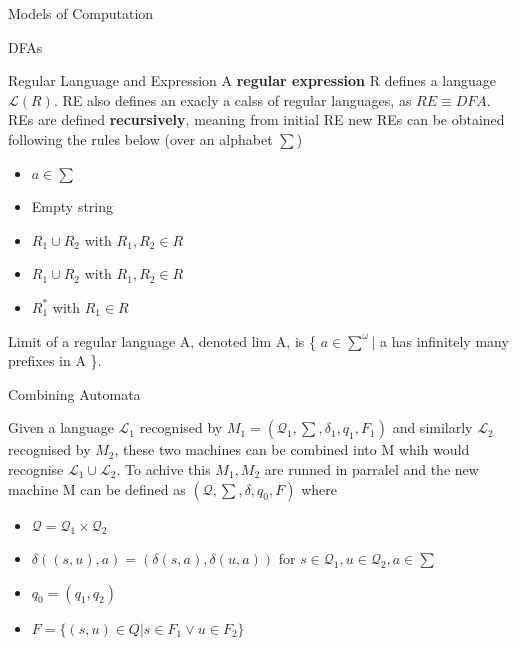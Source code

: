 \documentclass[12pt, letterpaper]{article}
\begin{document}
\begin{section}{Models of Computation}
\begin{subsection}{DFAs}
\begin{subsubsection}{Regular Language and Expression}
      A \textbf{regular expression} R defines a language \(\mathscr{L}(R)\). RE
      also defines an exacly a calss of regular languages, as \(RE \equiv DFA\).
      REs are defined \textbf{recursively}, meaning from initial RE new REs can
      be obtained following the rules below (over an alphabet \(\sum\))
      \begin{itemize}
        \item \(a \in \sum\)
        \item Empty string
        \item \(R_{1} \cup R_{2}\) with \(R_{1}, R_{2} \in R\)
        \item \(R_{1} \cup R_{2}\) with \(R_{1}, R_{2} \in R\)
        \item \(R_{1}^{*}\) with \(R_{1} \in R\)
      \end{itemize}

      Limit of a regular language A, denoted lim A, is
      \{ \(a \in \sum^{\omega} |\) a has infinitely many prefixes in A \}.
            
    \end{subsubsection}

    \begin{subsubsection}{Combining Automata}

      Given a language \(\mathscr{L}_{1}\) recognised by
      \(M_{1} = (\mathscr{Q}_{1}, \sum, \delta_{1}, q_{1}, F_{1})\) and
      similarly \(\mathscr{L}_{2}\) recognised by \(M_{2}\), these two machines
      can be combined into M whih would recognise
      \(\mathscr{L}_{1} \cup \mathscr{L}_{2}\). To achive this
      \(M_{1}, M_{2}\) are runned in parralel and the new machine M can be
      defined as \((\mathscr{Q}, \sum, \delta, q_{0}, F)\) where
      \begin{itemize}
        \item \(\mathscr{Q} = \mathscr{Q}_{1} \times \mathscr{Q}_{2}\)
        \item \(\delta((s, u), a) = (\delta(s, a), \delta(u, a))\) for
              \(s \in \mathscr{Q}_{1}, u \in \mathscr{Q}_{2}, a \in \sum\)
        \item \(q_{0} = (q_{1}, q_{2})\)
        \item \(F = \{ (s, u) \in Q | s \in F_{1} \lor u \in F_{2} \}\)
      \end{itemize}

    \end{subsubsection}

  \end{subsection}


\end{section}
\end{document}
